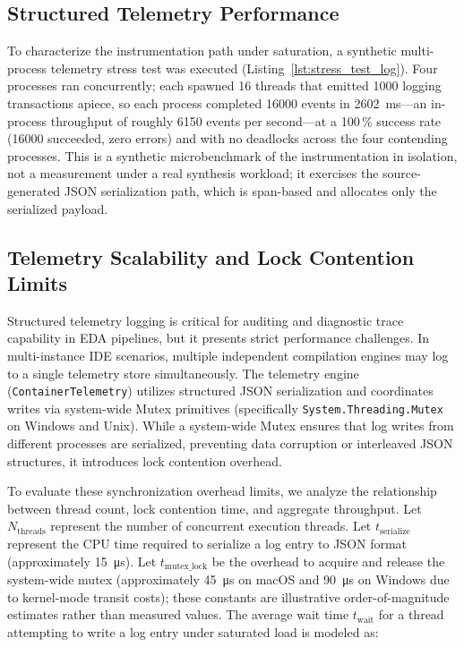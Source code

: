 \subsection{Structured Telemetry Performance}
To characterize the instrumentation path under saturation, a synthetic multi-process telemetry stress test was executed (Listing~\ref{lst:stress_test_log}). Four processes ran concurrently; each spawned 16 threads that emitted \num{1000} logging transactions apiece, so each process completed \num{16000} events in \SI{2602}{\milli\second}---an in-process throughput of roughly \num{6150} events per second---at a 100\,\% success rate (\num{16000} succeeded, zero errors) and with no deadlocks across the four contending processes. This is a synthetic microbenchmark of the instrumentation in isolation, not a measurement under a real synthesis workload; it exercises the source-generated JSON serialization path, which is span-based and allocates only the serialized payload.

\subsection{Telemetry Scalability and Lock Contention Limits}
Structured telemetry logging is critical for auditing and diagnostic trace capability in EDA pipelines, but it presents strict performance challenges. In multi-instance IDE scenarios, multiple independent compilation engines may log to a single telemetry store simultaneously.
The telemetry engine (\texttt{ContainerTelemetry}) utilizes structured JSON serialization and coordinates writes via system-wide Mutex primitives (specifically \texttt{System.Threading.Mutex} on Windows and Unix). While a system-wide Mutex ensures that log writes from different processes are serialized, preventing data corruption or interleaved JSON structures, it introduces lock contention overhead.

To evaluate these synchronization overhead limits, we analyze the relationship between thread count, lock contention time, and aggregate throughput. Let $N_{\text{threads}}$ represent the number of concurrent execution threads. Let $t_{\text{serialize}}$ represent the CPU time required to serialize a log entry to JSON format (approximately \SI{15}{\micro\second}). Let $t_{\text{mutex\_lock}}$ be the overhead to acquire and release the system-wide mutex (approximately \SI{45}{\micro\second} on macOS and \SI{90}{\micro\second} on Windows due to kernel-mode transit costs); these constants are illustrative order-of-magnitude estimates rather than measured values. The average wait time $t_{\text{wait}}$ for a thread attempting to write a log entry under saturated load is modeled as:

